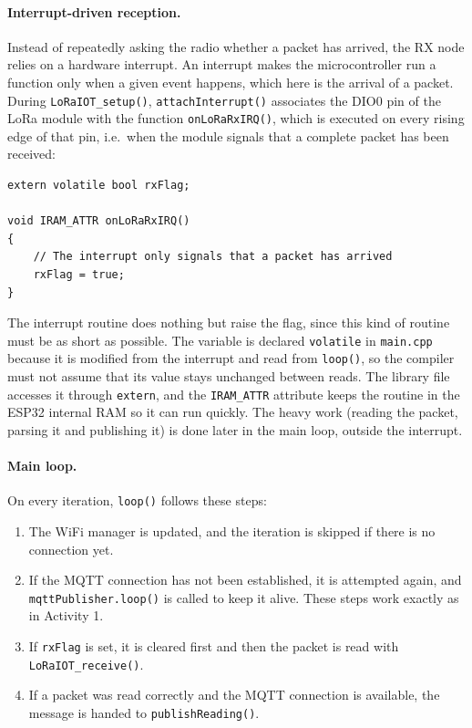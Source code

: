 \documentclass[informe,english]{plantilla}
\begin{document}
\paragraph{Interrupt-driven reception.} Instead of repeatedly asking the radio whether a packet has arrived, the RX node relies on a hardware interrupt. An interrupt makes the microcontroller run a function only when a given event happens, which here is the arrival of a packet. During \texttt{LoRaIOT\_setup()}, \texttt{attachInterrupt()} associates the DIO0 pin of the LoRa module with the function \texttt{onLoRaRxIRQ()}, which is executed on every rising edge of that pin, i.e.\ when the module signals that a complete packet has been received:

\begin{lstlisting}[style=arduino]
extern volatile bool rxFlag;

void IRAM_ATTR onLoRaRxIRQ()
{
    // The interrupt only signals that a packet has arrived
    rxFlag = true;
}
\end{lstlisting}

The interrupt routine does nothing but raise the flag, since this kind of routine must be as short as possible. The variable is declared \texttt{volatile} in \texttt{main.cpp} because it is modified from the interrupt and read from \texttt{loop()}, so the compiler must not assume that its value stays unchanged between reads. The library file accesses it through \texttt{extern}, and the \texttt{IRAM\_ATTR} attribute keeps the routine in the ESP32 internal RAM so it can run quickly. The heavy work (reading the packet, parsing it and publishing it) is done later in the main loop, outside the interrupt.

\paragraph{Main loop.} On every iteration, \texttt{loop()} follows these steps:

\begin{enumerate}[noitemsep]

    \item The WiFi manager is updated, and the iteration is skipped if there is no connection yet.

    \item If the MQTT connection has not been established, it is attempted again, and \texttt{mqttPublisher.loop()} is called to keep it alive. These steps work exactly as in Activity 1.

    \item If \texttt{rxFlag} is set, it is cleared first and then the packet is read with \texttt{LoRaIOT\_receive()}.

    \item If a packet was read correctly and the MQTT connection is available, the message is handed to \texttt{publishReading()}.

\end{enumerate}
\end{document}

